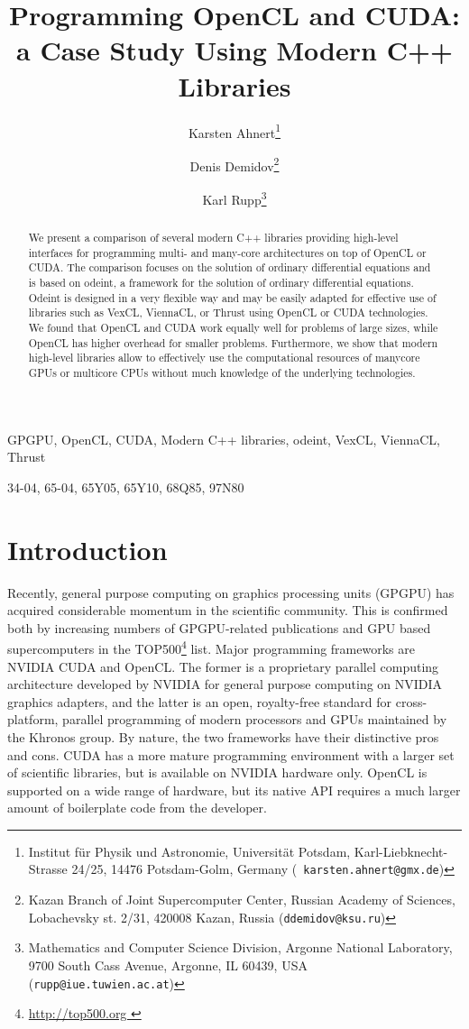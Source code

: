 \documentclass[final]{siamltex}
\title{Programming OpenCL and CUDA:\\a Case Study Using Modern C++ Libraries}
\author{
Karsten Ahnert\thanks{Institut f\"ur Physik und Astronomie, Universit\"at Potsdam,
Karl-Liebknecht-Strasse 24/25, 14476 Potsdam-Golm, Germany ({\tt
karsten.ahnert@gmx.de}) }
\and Denis Demidov\thanks{
Kazan Branch of Joint Supercomputer Center,
Russian Academy of Sciences,
Lobachevsky st. 2/31, 420008 Kazan, Russia
({\tt ddemidov@ksu.ru}) }
\and Karl Rupp\thanks{Mathematics and Computer Science Division,
Argonne National Laboratory,
9700 South Cass Avenue, Argonne, IL 60439, USA
({\tt rupp@iue.tuwien.ac.at}) } }
\begin{document}
\maketitle

\begin{abstract}
    We present a comparison of several modern C++ libraries providing high-level interfaces
    for programming multi- and many-core architectures on top of OpenCL or CUDA.
    The comparison focuses on the solution of ordinary differential equations and is based on odeint,
    a framework for the solution of ordinary differential equations. Odeint is designed in a
    very flexible way and may be easily adapted for effective use of libraries such
    as VexCL, ViennaCL, or Thrust using OpenCL or CUDA technologies.
    We found that OpenCL and CUDA work equally well for problems
    of large sizes, while OpenCL has higher overhead for smaller problems.
    Furthermore, we show that modern high-level libraries allow to effectively
    use the computational resources of manycore GPUs or multicore CPUs without much
    knowledge of the underlying technologies.
\end{abstract}

\begin{keywords}
    GPGPU, OpenCL, CUDA, Modern C++ libraries, odeint, VexCL, ViennaCL, Thrust
\end{keywords}

\begin{AMS}
    34-04, 65-04, 65Y05, 65Y10, 68Q85, 97N80
\end{AMS}


%
%
\section{Introduction}

\pagestyle{myheadings}

\thispagestyle{plain}


Recently, general purpose computing on graphics processing units (GPGPU) has
acquired considerable momentum in the scientific community. This is confirmed
both by increasing numbers of GPGPU-related publications and GPU based
supercomputers in the TOP500\footnote{ \href{ http://top500.org }{
http://top500.org }} list. Major programming frameworks are NVIDIA CUDA and
OpenCL.  The former is a proprietary parallel computing architecture developed
by NVIDIA for general purpose computing on NVIDIA graphics adapters, and the
latter is an open, royalty-free standard for cross-platform, parallel
programming of modern processors and GPUs maintained by the Khronos group. By nature,
the two frameworks have their distinctive pros and cons. CUDA has a more mature
programming environment with a larger set of scientific libraries, but is
available on NVIDIA hardware only. OpenCL is supported on a wide range of hardware,
but its native API requires a much larger amount of boilerplate code from the
developer.
\end{document}
